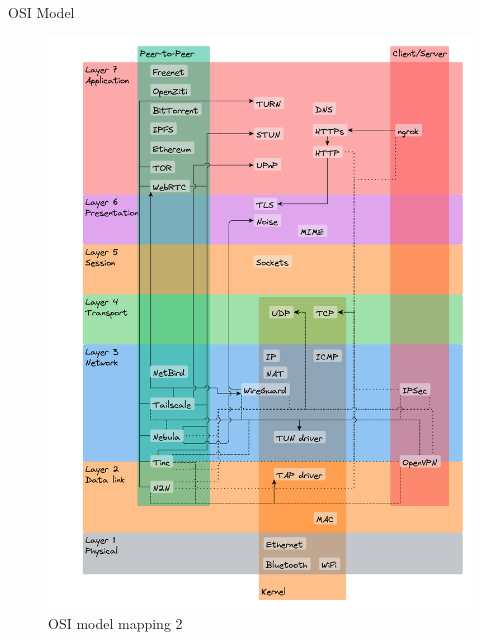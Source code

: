 \begin{frame}[fragile]{OSI Model}
\begin{figure}
\centering
\includegraphics[width=\textwidth,height=0.9\textheight]{notes/../figures/osi-map.yed.png}
\caption{OSI model mapping 2}
\end{figure}

\newpage


\end{frame}
